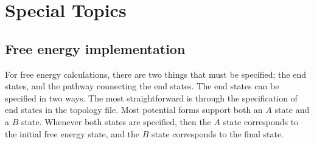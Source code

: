 %
%
%
%
%
%
%

\chapter{Special Topics}
\label{ch:special}

\section{Free energy implementation}
\label{sec:dgimplement}
For free energy calculations, there are two things that must be
specified; the end states, and the pathway connecting the end states.
The end states can be specified in two ways.  The most straightforward
is through the specification of end states in the topology file.  Most
potential forms support both an $A$ state and a $B$ state. Whenever both
states are specified, then the $A$ state corresponds to the initial free
energy state, and the $B$ state corresponds to the final state.

